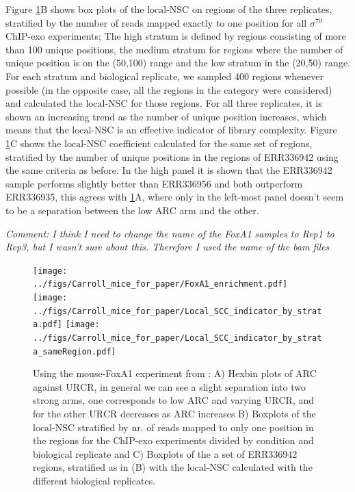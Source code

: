 \documentclass{bmcart}\usepackage[]{graphicx}\usepackage[]{color}
\begin{document}
Figure \ref{fig:enrich}B shows box plots of the $\mbox{local-NSC}$ on
regions of the three replicates, stratified by the number of reads
mapped exactly to one position for all $\sigma^{70}$ ChIP-exo
experiments; The high stratum is defined by regions consisting of more
than 100 unique positions, the medium stratum for regions
where the number of unique position is on the
(50,100) range and the low stratum in the
(20,50) range. For each stratum and biological
replicate, we sampled 400 regions whenever possible (in the
opposite case, all the regions in the category were considered) and
calculated the $\mbox{local-NSC}$ for those regions. For all three
replicates, it is shown an increasing trend as the number of unique
position increases, which means that the $\mbox{local-NSC}$ is an
effective indicator of library complexity. Figure \ref{fig:enrich}C
shows the $\mbox{local-NSC}$ coefficient calculated for the same set
of regions, stratified by the number of unique positions in the
regions of ERR336942 using the same criteria as before. In the high
panel it is shown that the ERR336942 sample performs slightly better
than ERR336956 and both outperform ERR336935, this agrees with
\ref{fig:enrich}A, where only in the left-most panel doesn't seem to
be a separation between the low $\mbox{ARC}$ arm and the other.

\emph{Comment: I think I need to change the name of the FoxA1 samples
  to Rep1 to Rep3, but I wasn't sure about this. Therefore I used the
  name of the bam files}

\begin{figure}[h!]
  \centering
  \texttt{[image: ../figs/Carroll\_mice\_for\_paper/FoxA1\_enrichment.pdf]}
  \texttt{[image: ../figs/Carroll\_mice\_for\_paper/Local\_SCC\_indicator\_by\_strata.pdf]}
  \texttt{[image: ../figs/Carroll\_mice\_for\_paper/Local\_SCC\_indicator\_by\_strata\_sameRegion.pdf]}
  \caption{Using the mouse-FoxA1 experiment from \cite{exoillumina}:
    A) Hexbin plots of $\mbox{ARC}$ against $\mbox{URCR}$, in general
    we can see a slight separation into two strong arms, one
    corresponds to low $\mbox{ARC}$ and varying $\mbox{URCR}$, and for
    the other $\mbox{URCR}$ decreases as $\mbox{ARC}$ increases B)
    Boxplots of the $\mbox{local-NSC}$ stratified by nr. of reads
    mapped to only one position in the regions for the ChIP-exo
    experiments divided by condition and biological replicate and C)
    Boxplots of the a set of ERR336942 regions, stratified as in (B)
    with the $\mbox{local-NSC}$ calculated with the different
    biological replicates.}
  \label{fig:enrich}
\end{figure}
\end{document}
